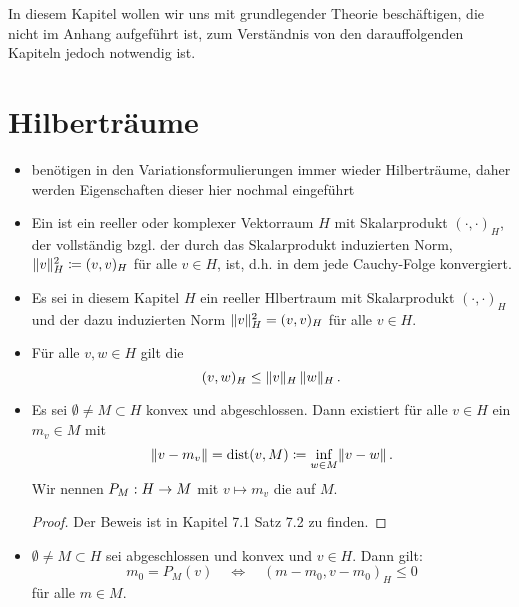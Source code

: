 \label{sec:Grundlagen}

In diesem Kapitel wollen wir uns mit grundlegender Theorie beschäftigen, die nicht im Anhang aufgeführt ist, zum Verständnis von den darauffolgenden Kapiteln jedoch notwendig ist.

\section{Hilberträume}

\begin{itemize}
\item benötigen in den Variationsformulierungen immer wieder Hilberträume, daher werden Eigenschaften dieser hier nochmal eingeführt
\item \begin{defi}
Ein \textit{} ist ein reeller oder komplexer Vektorraum $H$ mit Skalarprodukt $(\cdot, \cdot)_H$, der vollständig bzgl. der durch das Skalarprodukt induzierten Norm, $\lVert v\rVert_H^2 \coloneqq{(v,v)_H}$ für alle $v \in H$, ist, d.h. in dem jede Cauchy-Folge konvergiert.
\end{defi}

\item Es sei in diesem Kapitel $H$ ein reeller Hlbertraum mit Skalarprodukt $(\cdot,\cdot)_H$ und der dazu induzierten Norm $\lVert v\rVert_H^2 = (v,v)_H$ für alle $v \in H$.

\item \begin{bem*}
Für alle $v,w \in H$ gilt die 
\[
	(v,w)_H \le \lVert v\rVert_H \, \lVert w\rVert_H \, .
\]
\end{bem*}

\item \begin{satz}
Es sei $\emptyset\neq M\subset H$ konvex und abgeschlossen. Dann existiert für alle $v\in H$ ein $m_v\in M$ mit
\[ 
  	\lVert v-m_v\rVert=\operatorname{dist}(v,M)\coloneqq \inf_{w\in M}\lVert v-w\rVert\, .
\]
Wir nennen $P_M:H\rightarrow M$ mit $v\mapsto m_v$ die  auf $M$.
\end{satz}

\begin{proof}
Der Beweis ist in \cite{Walker} Kapitel 7.1 Satz 7.2 zu finden.
\end{proof}

\item \begin{satz}\label{satz:2.3}
$\emptyset\neq M\subset H$ sei abgeschlossen und konvex und $v\in H$. Dann gilt:
\[ 
  	m_0=P_M(v)\quad\Longleftrightarrow\quad (m-m_0, v-m_0)_H\leq0 
\]
für alle $m\in M$.
\end{satz}


\end{itemize}
